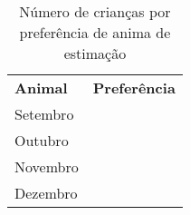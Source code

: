 \documentclass{article}
\begin{document}
\newcommand\MyCirc{\raisebox{-2pt}{\tikz\draw[fill,orange] circle (1.5ex);}\,}
\newcommand\MySemi{\raisebox{-2pt}{\tikz\draw[fill,orange] (0,0) arc (90:360/4*3:1.5ex);}\,}
\newcommand\MyQuarter{\raisebox{-2pt}{\tikz[scale=.25] \fill[orange] (0,0) -- (-1,0) arc (180:270:1) -- cycle;}\,}
\newcommand\MyThreeQuarter{\raisebox{-2pt}{\tikz[scale=.25] \fill[orange] (0,0) -- (1,0) arc (0:-90*3:1) -- cycle;}\,}

\MySemi
\MyQuarter
\MyThreeQuarter



\begin{table}[!h]
\caption{Número de crianças por preferência de anima de estimação}
\begin{center}
\begin{tabular}{p{20ex}p{35ex}}
\textbf{Animal}   & \textbf{Preferência}\\
Setembro     & \MyCirc \MySemi\\
Outubro & \MyCirc \MyCirc \MyCirc \MyQuarter \\
Novembro  & \MyCirc \MyCirc \MyThreeQuarter\\
Dezembro  & \MyCirc\MyCirc\MyCirc\MyCirc
\end{tabular}
\end{center}
\end{table}
\end{document}
